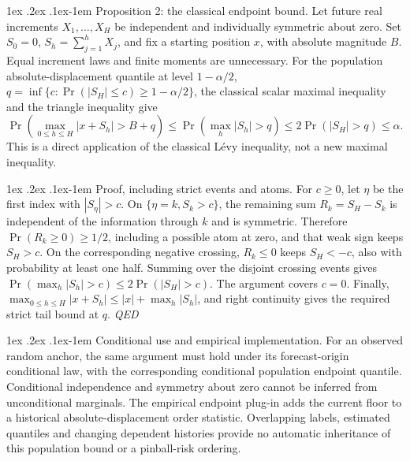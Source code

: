 \documentclass[10pt,a4paper]{article}
\makeatletter
\renewcommand\paragraph{\@startsection{paragraph}{4}{\z@}%
  {1ex \@plus .2ex \@minus .1ex}{-1em}%
  {\normalfont\normalsize\bfseries}}
\makeatother
\begin{document}
\paragraph{Proposition 2: the classical endpoint bound.}
Let future real increments \(X_1,\ldots,X_H\) be independent and individually
symmetric about zero. Set \(S_0=0\), \(S_h=\sum_{j=1}^hX_j\), and fix a starting
position \(x\), with absolute magnitude \(B\). Equal increment laws and finite moments are unnecessary.
For the population absolute-displacement quantile at level \(1-\alpha/2\),
\(q=\inf\{c:\Pr(|S_H|\le c)\ge1-\alpha/2\}\), the classical scalar maximal
inequality and the triangle inequality give
\[
\Pr\!\left(\max_{0\le h\le H}|x+S_h|>B+q\right)\le\Pr\!\left(\max_h|S_h|>q\right)\le2\Pr(|S_H|>q)\le\alpha.
\]
This is a direct application of the classical L\'evy inequality, not a new
maximal inequality.

\paragraph{Proof, including strict events and atoms.}
For \(c\ge0\), let \(\eta\) be the first index with \(|S_\eta|>c\). On
\(\{\eta=k,S_k>c\}\), the remaining sum \(R_k=S_H-S_k\) is independent of
the information through \(k\) and is symmetric. Therefore \(\Pr(R_k\ge0)\ge1/2\),
including a possible atom at zero, and that weak sign keeps \(S_H>c\).
On the corresponding negative crossing, \(R_k\le0\) keeps \(S_H<-c\), also
with probability at least one half. Summing over the disjoint crossing events
gives \(\Pr(\max_h|S_h|>c)\le2\Pr(|S_H|>c)\). The argument covers \(c=0\).
Finally, \(\max_{0\le h\le H}|x+S_h|\le |x|+\max_h|S_h|\), and right
continuity gives the required strict tail bound at \(q\). \hfill\textit{QED}

\paragraph{Conditional use and empirical implementation.}
For an observed random anchor, the same argument must hold under its
forecast-origin conditional law, with the corresponding conditional population
endpoint quantile. Conditional independence and symmetry about zero cannot be inferred from unconditional marginals. The empirical endpoint plug-in adds the current
floor to a historical absolute-displacement order statistic. Overlapping labels,
estimated quantiles and changing dependent histories provide no automatic
inheritance of this population bound or a pinball-risk ordering.
\end{document}
